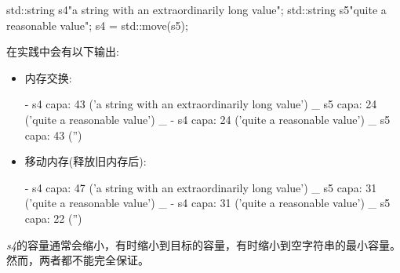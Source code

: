 \begin{cppcode}
std::string s4{"a string with an extraordinarily long value"};
std::string s5{"quite a reasonable value"};
s4 = std::move(s5);
\end{cppcode}

在实践中会有以下输出:

\begin{itemize}
	\item 内存交换:
	\begin{shell} 	
	- s4 capa: 43 ('a string with an extraordinarily long value') _
	s5 capa: 24 ('quite a reasonable value') _
	- s4 capa: 24 ('quite a reasonable value') _
	s5 capa: 43 ('')
	\end{shell}	
	\item 移动内存(释放旧内存后):
	\begin{shell}
	- s4 capa: 47 ('a string with an extraordinarily long value') _
	s5 capa: 31 ('quite a reasonable value') _
	- s4 capa: 31 ('quite a reasonable value') _
	s5 capa: 22 ('')
	\end{shell}	
\end{itemize}

\textit{s4}的容量通常会缩小，有时缩小到目标的容量，有时缩小到空字符串的最小容量。然而，两者都不能完全保证。













